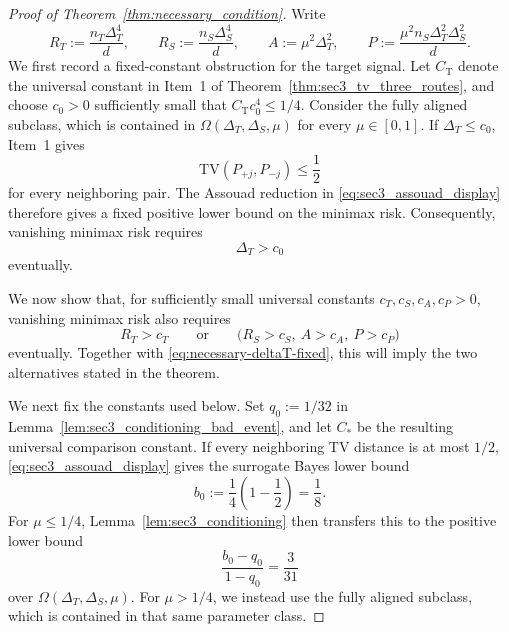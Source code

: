 \documentclass[10pt]{article}
\newcommand{\TV}{\mathrm{TV}}
\newcommand{\trg}{T}
\newcommand{\nT}{n_{\trg}}
\newcommand{\DeltaT}{\Delta_{\trg}}
\newcommand{\src}{S}
\newcommand{\nS}{n_{\src}}
\newcommand{\DeltaS}{\Delta_{\src}}
\begin{document}
\begin{proof}[Proof of Theorem~\ref{thm:necessary_condition}]
Write
\[
    R_T:=\frac{\nT\DeltaT^4}{d},\qquad
    R_S:=\frac{\nS\DeltaS^4}{d},\qquad
    A:=\mu^2\DeltaT^2,\qquad
    P:=\frac{\mu^2\nS\DeltaT^2\DeltaS^2}{d}.
\]
We first record a fixed-constant obstruction for the target signal. Let
$C_{\mathrm T}$ denote the universal constant in Item~1 of
Theorem~\ref{thm:sec3_tv_three_routes}, and choose $c_0>0$ sufficiently small
that $C_{\mathrm T}c_0^4\le 1/4$. Consider the fully aligned subclass, which is
contained in $\Omega(\DeltaT,\DeltaS,\mu)$ for every $\mu\in[0,1]$. If
$\DeltaT\le c_0$, Item~1 gives
\[
    \TV(P_{+j},P_{-j})\le\frac12
\]
for every neighboring pair. The Assouad reduction in
\eqref{eq:sec3_assouad_display} therefore gives a fixed positive lower bound
on the minimax risk. Consequently, vanishing minimax risk requires
\begin{equation}
\label{eq:necessary-deltaT-fixed}
    \DeltaT>c_0
\end{equation}
eventually.

We now show that, for sufficiently small universal constants
$c_T,c_S,c_A,c_P>0$, vanishing minimax risk also requires
\begin{equation}
\label{eq:necessary-fixed-threshold}
    R_T>c_T
    \qquad\text{or}\qquad
    \bigl(R_S>c_S,\ A>c_A,\ P>c_P\bigr)
\end{equation}
eventually. Together with \eqref{eq:necessary-deltaT-fixed}, this will imply
the two alternatives stated in the theorem.

We next fix the constants used below. Set $q_0:=1/32$ in
Lemma~\ref{lem:sec3_conditioning_bad_event}, and let $C_*$ be the resulting
universal comparison constant. If every neighboring TV distance is at most
$1/2$, \eqref{eq:sec3_assouad_display} gives the surrogate Bayes lower bound
\[
    b_0:=\frac14\left(1-\frac12\right)=\frac18.
\]
For $\mu\le1/4$, Lemma~\ref{lem:sec3_conditioning} then transfers this to the
positive lower bound
\begin{equation}
\label{eq:conditioned-positive-bayes-bound}
    \frac{b_0-q_0}{1-q_0}=\frac3{31}
\end{equation}
over $\Omega(\DeltaT,\DeltaS,\mu)$. For $\mu>1/4$, we instead use the fully
aligned subclass, which is contained in that same parameter class.


\end{proof}
\end{document}
